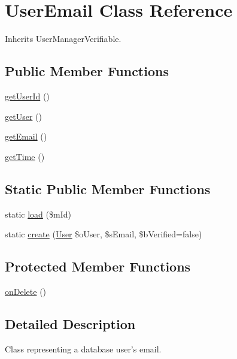 \hypertarget{class_user_email}{\section{User\-Email Class Reference}
\label{class_user_email}
}


Inherits User\-Manager\-Verifiable.

\subsection*{Public Member Functions}
\begin{DoxyCompactItemize}
\item 
\hyperlink{class_user_email_ac9b1e7edcdcd48eec9ccb2fb5711a577}{get\-User\-Id} ()
\item 
\hyperlink{class_user_email_a844cbe89fe63a916e7c94d0eb406d35b}{get\-User} ()
\item 
\hyperlink{class_user_email_acaec211e03fa414944e36d83edbea08d}{get\-Email} ()
\item 
\hyperlink{class_user_email_acd88adffa8ae3d79d0971e0f63944252}{get\-Time} ()
\end{DoxyCompactItemize}
\subsection*{Static Public Member Functions}
\begin{DoxyCompactItemize}
\item 
static \hyperlink{class_user_email_a7be06006c7d1922e696eac6b0510ae0a}{load} (\$m\-Id)
\item 
static \hyperlink{class_user_email_a4f7a60f9a7301d4cb023091c7dd48268}{create} (\hyperlink{class_user}{User} \$o\-User, \$s\-Email, \$b\-Verified=false)
\end{DoxyCompactItemize}
\subsection*{Protected Member Functions}
\begin{DoxyCompactItemize}
\item 
\hyperlink{class_user_email_a037de729f1a654bb04b91f9e9572b059}{on\-Delete} ()
\end{DoxyCompactItemize}


\subsection{Detailed Description}
Class representing a database user's email.

